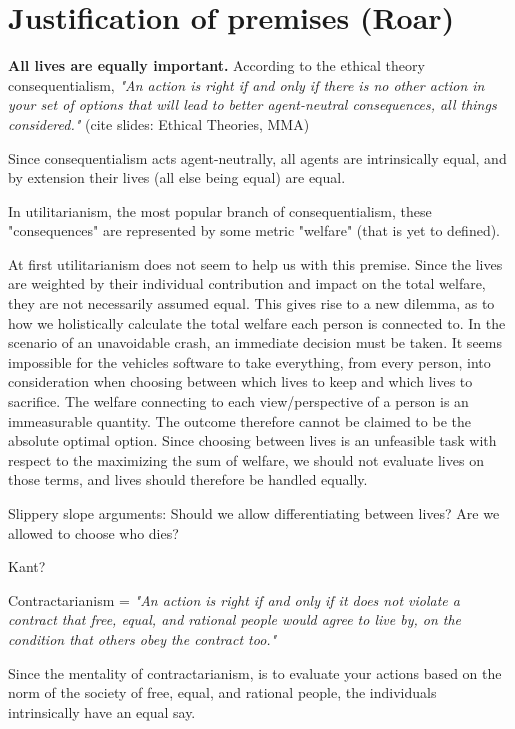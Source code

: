 \section{Justification of premises (Roar)}

\textbf{All lives are equally important.}
According to the ethical theory consequentialism, \textit{"An action is right if and only if there is no other action in your set of options that will lead to better agent-neutral consequences, all things considered."} (cite slides: Ethical Theories, MMA)

Since consequentialism acts agent-neutrally, all agents are intrinsically equal, and by extension their lives (all else being equal) are equal.

In utilitarianism, the most popular branch of consequentialism, these "consequences" are represented by some metric "welfare" (that is yet to defined). 

At first utilitarianism does not seem to help us with this premise. Since the lives are weighted by their individual contribution and impact on the total welfare, they are not necessarily assumed equal. This gives rise to a new dilemma, as to how we holistically calculate the total welfare each person is connected to. In the scenario of an unavoidable crash, an immediate decision must be taken. It seems impossible for the vehicles software to take everything, from every person, into consideration when choosing between which lives to keep and which lives to sacrifice. The welfare connecting to each view/perspective of a person is an immeasurable quantity. The outcome therefore cannot be claimed to be the absolute optimal option. Since choosing between lives is an unfeasible task with respect to the maximizing the sum of welfare, we should not evaluate lives on those terms, and lives should therefore be handled equally.

Slippery slope arguments:
Should we allow differentiating between lives?
Are we allowed to choose who dies?

Kant?

Contractarianism = \textit{"An action is right if and only if it does not violate a contract that free, equal, and rational people would agree to live by, on the condition that others obey the contract too."}

Since the mentality of contractarianism, is to evaluate your actions based on the norm of the society of free, equal, and rational people, the individuals intrinsically have an equal say. 


